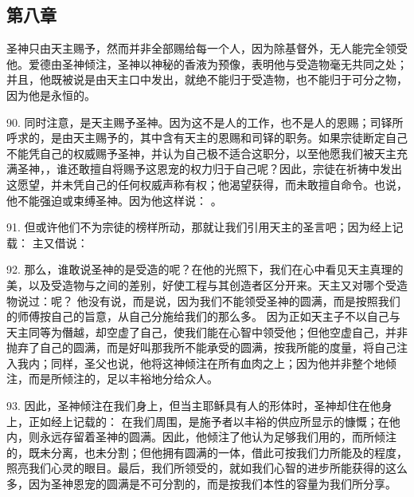 
\subsection{第八章}

圣神只由天主赐予，然而并非全部赐给每一个人，因为除基督外，无人能完全领受他。爱德由圣神倾注，圣神以神秘的香液为预像，表明他与受造物毫无共同之处；并且，他既被说是由天主口中发出，就绝不能归于受造物，也不能归于可分之物，因为他是永恒的。\par

90. 同时注意，是天主赐予圣神。因为这不是人的工作，也不是人的恩赐；司铎所呼求的，是由天主赐予的，其中含有天主的恩赐和司铎的职务。如果宗徒断定自己不能凭自己的权威赐予圣神，并认为自己极不适合这职分，以至他愿我们被天主充满圣神，，谁还敢擅自将赐予这恩宠的权力归于自己呢？因此，宗徒在祈祷中发出这愿望，并未凭自己的任何权威声称有权；他渴望获得，而未敢擅自命令。也说，他不能强迫或束缚圣神。因为他这样说： 。\par

91. 但或许他们不为宗徒的榜样所动，那就让我们引用天主的圣言吧；因为经上记载：  主又借说： \par

92. 那么，谁敢说圣神的是受造的呢？在他的光照下，我们在心中看见天主真理的美，以及受造物与之间的差别，好使工程与其创造者区分开来。天主又对哪个受造物说过：呢？ 他没有说，而是说，因为我们不能领受圣神的圆满，而是按照我们的师傅按自己的旨意，从自己分施给我们的那么多。 因为正如天主子不以自己与天主同等为僭越，却空虚了自己，使我们能在心智中领受他；但他空虚自己，并非抛弃了自己的圆满，而是好叫那我所不能承受的圆满，按我所能的度量，将自己注入我内；同样，圣父也说，他将这神倾注在所有血肉之上；因为他并非整个地倾注，而是所倾注的，足以丰裕地分给众人。\par

93. 因此，圣神倾注在我们身上，但当主耶稣具有人的形体时，圣神却住在他身上，正如经上记载的：  在我们周围，是施予者以丰裕的供应所显示的慷慨；在他内，则永远存留着圣神的圆满。因此，他倾注了他认为足够我们用的，而所倾注的，既未分离，也未分割；但他拥有圆满的一体，借此可按我们力所能及的程度，照亮我们心灵的眼目。最后，我们所领受的，就如我们心智的进步所能获得的这么多，因为圣神恩宠的圆满是不可分割的，而是按我们本性的容量为我们所分享。\par

